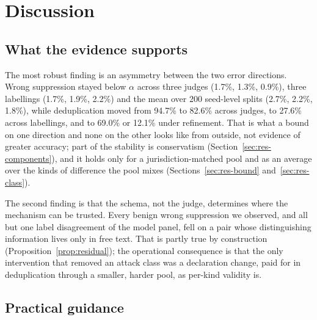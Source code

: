 \section{Discussion}\label{sec:discussion}

\subsection{What the evidence supports}

The most robust finding is an asymmetry between the two error directions. Wrong suppression stayed below $\alpha$ across three judges (1.7\%, 1.3\%, 0.9\%), three labellings (1.7\%, 1.9\%, 2.2\%) and the mean over 200 seed-level splits (2.7\%, 2.2\%, 1.8\%), while deduplication moved from 94.7\% to 82.6\% across judges, to 27.6\% across labellings, and to 69.0\% or 12.1\% under refinement. That is what a bound on one direction and none on the other looks like from outside, not evidence of greater accuracy; part of the stability is conservatism (Section~\ref{sec:res-components}), and it holds only for a jurisdiction-matched pool and as an average over the kinds of difference the pool mixes (Sections~\ref{sec:res-bound} and~\ref{sec:res-class}).

The second finding is that the schema, not the judge, determines where the mechanism can be trusted. Every benign wrong suppression we observed, and all but one label disagreement of the model panel, fell on a pair whose distinguishing information lives only in free text. That is partly true by construction (Proposition~\ref{prop:residual}); the operational consequence is that the only intervention that removed an attack class was a declaration change, paid for in deduplication through a smaller, harder pool, as per-kind validity is.

\subsection{Practical guidance}

